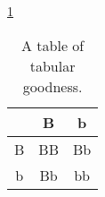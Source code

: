 \documentclass[letterpaper,12pt]{article}
\begin{document}



\ref{tab:magic}
\begin{table}
	\caption{\label{tab:magic} A table of tabular goodness.}
	\begin{center}
		\begin{tabular}{|c|c|c|}
			\hline
			& B & b \\
			\hline
			B & BB & Bb \\
			\hline
			b & Bb & bb \\
			\hline
		\end{tabular}
	\end{center}
\end{table}
\end{document}
